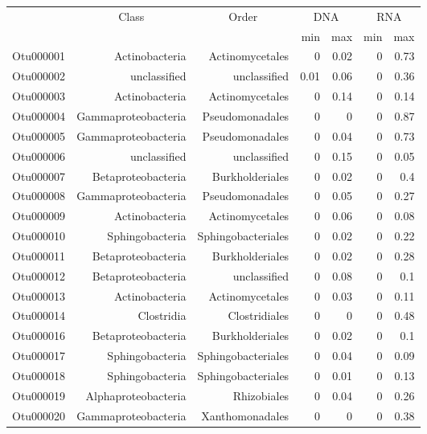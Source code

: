 \begin{table}[ht]
\centering
\begin{tabular}{crrrrrr}
  \hline
  & \multicolumn{1}{c}{Class} & \multicolumn{1}{c}{Order} & 
                      \multicolumn{2}{c}{DNA} & \multicolumn{2}{c}{RNA} \\
 & &  & min & max & min & max \\
 \hline
Otu000001 & Actinobacteria & Actinomycetales & 0 & 0.02 & 0 & 0.73 \\ 
  Otu000002 & unclassified & unclassified & 0.01 & 0.06 & 0 & 0.36 \\ 
  Otu000003 & Actinobacteria & Actinomycetales & 0 & 0.14 & 0 & 0.14 \\ 
  Otu000004 & Gammaproteobacteria & Pseudomonadales & 0 & 0 & 0 & 0.87 \\ 
  Otu000005 & Gammaproteobacteria & Pseudomonadales & 0 & 0.04 & 0 & 0.73 \\ 
  Otu000006 & unclassified & unclassified & 0 & 0.15 & 0 & 0.05 \\ 
  Otu000007 & Betaproteobacteria & Burkholderiales & 0 & 0.02 & 0 & 0.4 \\ 
  Otu000008 & Gammaproteobacteria & Pseudomonadales & 0 & 0.05 & 0 & 0.27 \\ 
  Otu000009 & Actinobacteria & Actinomycetales & 0 & 0.06 & 0 & 0.08 \\ 
  Otu000010 & Sphingobacteria & Sphingobacteriales & 0 & 0.02 & 0 & 0.22 \\ 
  Otu000011 & Betaproteobacteria & Burkholderiales & 0 & 0.02 & 0 & 0.28 \\ 
  Otu000012 & Betaproteobacteria & unclassified & 0 & 0.08 & 0 & 0.1 \\ 
  Otu000013 & Actinobacteria & Actinomycetales & 0 & 0.03 & 0 & 0.11 \\ 
  Otu000014 & Clostridia & Clostridiales & 0 & 0 & 0 & 0.48 \\ 
  Otu000016 & Betaproteobacteria & Burkholderiales & 0 & 0.02 & 0 & 0.1 \\ 
  Otu000017 & Sphingobacteria & Sphingobacteriales & 0 & 0.04 & 0 & 0.09 \\ 
  Otu000018 & Sphingobacteria & Sphingobacteriales & 0 & 0.01 & 0 & 0.13 \\ 
  Otu000019 & Alphaproteobacteria & Rhizobiales & 0 & 0.04 & 0 & 0.26 \\ 
  Otu000020 & Gammaproteobacteria & Xanthomonadales & 0 & 0 & 0 & 0.38 \\ 

\end{tabular}
\end{table}
